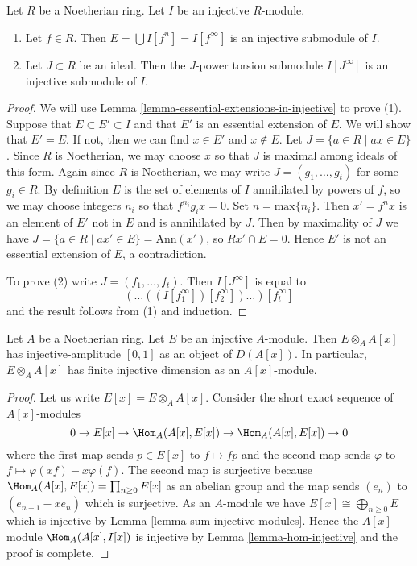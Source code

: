 \begin{lemma}
\label{lemma-injective-module-divide}
Let $R$ be a Noetherian ring. Let $I$ be an injective $R$-module.
\begin{enumerate}
\item Let $f \in R$. Then $E = \bigcup I[f^n] = I[f^\infty]$
is an injective submodule of $I$.
\item Let $J \subset R$ be an ideal. Then the $J$-power torsion
submodule $I[J^\infty]$ is an injective submodule of $I$.
\end{enumerate}
\end{lemma}

\begin{proof}
We will use Lemma \ref{lemma-essential-extensions-in-injective}
to prove (1).
Suppose that $E \subset E' \subset I$ and that $E'$ is an essential
extension of $E$. We will show that $E' = E$. If not, then we can
find $x \in E'$ and $x \not \in E$.
Let $J = \{ a \in R \mid ax \in E\}$. Since $R$ is Noetherian, we may
choose $x$ so that $J$ is maximal among ideals of this form. Again since
$R$ is Noetherian, we may write $J = (g_1, \ldots, g_t)$ for some
$g_i \in R$. By definition $E$ is the set of elements of $I$ annihilated
by powers of $f$, so we may choose integers $n_i$ so that $f^{n_i}g_ix = 0$.
Set $n = \mathrm{max}\{ n_i \}$.  Then $x' = f^n x$ is an element of $E'$
not in $E$ and is annihilated by $J$. Then by maximality of $J$ we have
$J = \{ a \in R \mid ax' \in E \} = \text{Ann}(x')$, so $Rx' \cap E  = 0$.
Hence $E'$ is not an essential extension of $E$, a contradiction.

\medskip\noindent
To prove (2) write $J = (f_1, \ldots, f_t)$. Then
$I[J^\infty]$ is equal to
$$
(\ldots((I[f_1^\infty])[f_2^\infty])\ldots)[f_t^\infty]
$$
and the result follows from (1) and induction.
\end{proof}

\begin{lemma}
\label{lemma-injective-dimension-over-polynomial-ring}
Let $A$ be a Noetherian ring. Let $E$ be an injective $A$-module.
Then $E \otimes_A A[x]$ has injective-amplitude $[0, 1]$
as an object of $D(A[x])$. In particular, $E \otimes_A A[x]$
has finite injective dimension as an $A[x]$-module.
\end{lemma}

\begin{proof}
Let us write $E[x] = E \otimes_A A[x]$. Consider the short exact
sequence of $A[x]$-modules
$$
0 \to E[x] \to \Hom_A(A[x], E[x]) \to \Hom_A(A[x], E[x]) \to 0
$$
where the first map sends $p \in E[x]$ to $f \mapsto fp$ and the
second map sends $\varphi$ to $f \mapsto \varphi(xf) - x\varphi(f)$.
The second map is surjective because
$\Hom_A(A[x], E[x]) = \prod_{n \geq 0} E[x]$ as an abelian group and
the map sends $(e_n)$ to $(e_{n + 1} - xe_n)$ which is surjective.
As an $A$-module we have $E[x] \cong \bigoplus_{n \geq 0} E$
which is injective by Lemma \ref{lemma-sum-injective-modules}.
Hence the $A[x]$-module $\Hom_A(A[x], I[x])$ is injective by
Lemma \ref{lemma-hom-injective} and the proof is complete.
\end{proof}



